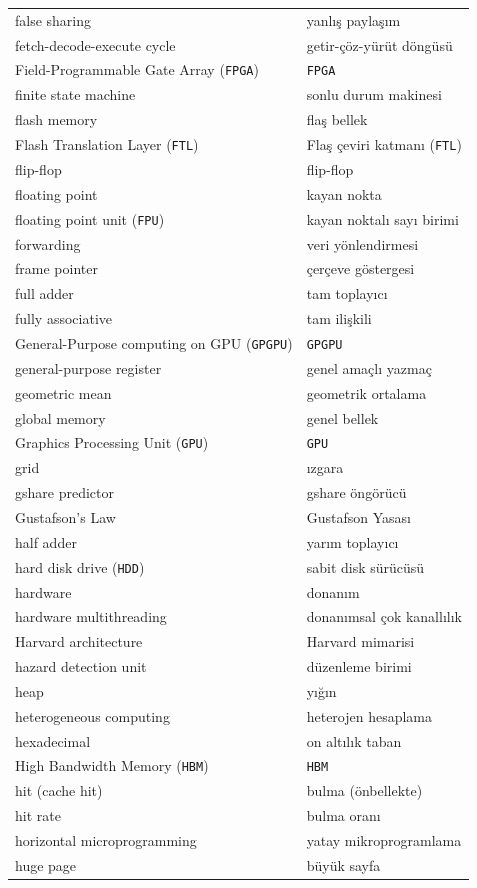 {\begin{longtable}{@{}p{7.6cm}p{7.6cm}@{}}
false sharing & yanlış paylaşım \\
fetch-decode-execute cycle & getir-çöz-yürüt döngüsü \\
Field-Programmable Gate Array (\texttt{FPGA}) & \texttt{FPGA} \\
finite state machine & sonlu durum makinesi \\
flash memory & flaş bellek \\
Flash Translation Layer (\texttt{FTL}) & Flaş çeviri katmanı (\texttt{FTL}) \\
flip-flop & flip-flop \\
floating point & kayan nokta \\
floating point unit (\texttt{FPU}) & kayan noktalı sayı birimi \\
forwarding & veri yönlendirmesi \\
frame pointer & çerçeve göstergesi \\
full adder & tam toplayıcı \\
fully associative & tam ilişkili \\

General-Purpose computing on GPU (\texttt{GPGPU}) & \texttt{GPGPU} \\
general-purpose register & genel amaçlı yazmaç \\
geometric mean & geometrik ortalama \\
global memory & genel bellek \\
Graphics Processing Unit (\texttt{GPU}) & \texttt{GPU} \\
grid & ızgara \\
gshare predictor & gshare öngörücü \\
Gustafson's Law & Gustafson Yasası \\

half adder & yarım toplayıcı \\
hard disk drive (\texttt{HDD}) & sabit disk sürücüsü \\
hardware & donanım \\
hardware multithreading & donanımsal çok kanallılık \\
Harvard architecture & Harvard mimarisi \\
hazard detection unit & düzenleme birimi \\
heap & yığın \\
heterogeneous computing & heterojen hesaplama \\
hexadecimal & on altılık taban \\
High Bandwidth Memory (\texttt{HBM}) & \texttt{HBM} \\
hit (cache hit) & bulma (önbellekte) \\
hit rate & bulma oranı \\
horizontal microprogramming & yatay mikroprogramlama \\
huge page & büyük sayfa \\


\end{longtable}}
